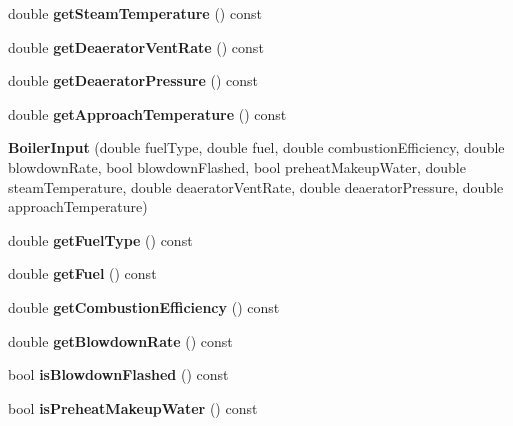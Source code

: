 \begin{DoxyCompactItemize}
double {\bfseries get\+Steam\+Temperature} () const
\item 
\mbox{\label{class_boiler_input_a95ad03651a9b5caac6c8cd8e19e76a0b}} 
double {\bfseries get\+Deaerator\+Vent\+Rate} () const
\item 
\mbox{\label{class_boiler_input_a74475254323b0d3ebe8636a45437366f}} 
double {\bfseries get\+Deaerator\+Pressure} () const
\item 
\mbox{\label{class_boiler_input_a0c458f1838e99f98f5eaf5c9217b1033}} 
double {\bfseries get\+Approach\+Temperature} () const
\item 
\mbox{\label{class_boiler_input_aa0f215112228b7406daa0f7a1adcb64b}} 
{\bfseries Boiler\+Input} (double fuel\+Type, double fuel, double combustion\+Efficiency, double blowdown\+Rate, bool blowdown\+Flashed, bool preheat\+Makeup\+Water, double steam\+Temperature, double deaerator\+Vent\+Rate, double deaerator\+Pressure, double approach\+Temperature)
\item 
\mbox{\label{class_boiler_input_a128aabf791e419378f48600119685bd1}} 
double {\bfseries get\+Fuel\+Type} () const
\item 
\mbox{\label{class_boiler_input_a33ddf0d6523d3acc0f40f36ae0a0e71f}} 
double {\bfseries get\+Fuel} () const
\item 
\mbox{\label{class_boiler_input_a4e84b0ba74ba445ef12c5b53a759ae3d}} 
double {\bfseries get\+Combustion\+Efficiency} () const
\item 
\mbox{\label{class_boiler_input_a5257376f2baa0fb06719c3fd7adb841e}} 
double {\bfseries get\+Blowdown\+Rate} () const
\item 
\mbox{\label{class_boiler_input_a9821b82ca30068ed1f8dc9cc1377c449}} 
bool {\bfseries is\+Blowdown\+Flashed} () const
\item 
\mbox{\label{class_boiler_input_a72cde34ac73269a7018859e601629777}} 
bool {\bfseries is\+Preheat\+Makeup\+Water} () const

\end{DoxyCompactItemize}
